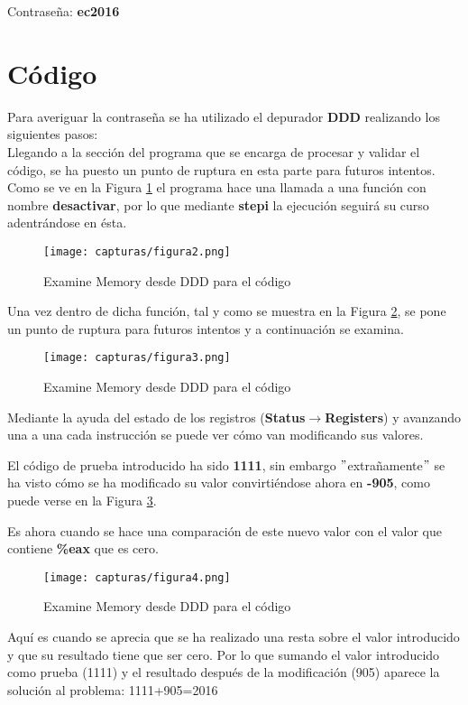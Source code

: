 Contraseña: \textbf{ec2016}
\newpage

%	

\section{Código}
Para averiguar la contraseña se ha utilizado el depurador \textbf{DDD} realizando los siguientes pasos:
\\

Llegando a la sección del programa que se encarga de procesar y validar el código, se ha puesto un punto de ruptura en esta parte para futuros intentos.\\

Como se ve en la Figura \ref{fig:figura2} el programa hace una llamada a una función con nombre \textbf{desactivar}, por lo que mediante \textbf{stepi} la ejecución seguirá su curso adentrándose en ésta.\\
\begin{figure}[H]
	\centering
	\texttt{[image: capturas/figura2.png]} 
	\caption{Examine Memory desde DDD para el código} 
	\label{fig:figura2}
\end{figure}
Una vez dentro de dicha función, tal y como se muestra en la Figura \ref{fig:figura3}, se pone un punto de ruptura para futuros intentos y a continuación se examina.


\begin{figure}[H]
	\centering
	\texttt{[image: capturas/figura3.png]} 
	\caption{Examine Memory desde DDD para el código} 
	\label{fig:figura3}
\end{figure}

Mediante la ayuda del estado de los registros (\textbf{Status}$ \rightarrow $\textbf{Registers}) y avanzando una a una cada instrucción se puede ver cómo van modificando sus valores.
\newpage



El código de prueba introducido ha sido \textbf{1111}, sin embargo $ " $extrañamente$ " $ se ha visto cómo se ha modificado su valor convirtiéndose ahora en \textbf{-905}, como puede verse en la Figura \ref{fig:figura4}.

Es ahora cuando se hace una comparación de este nuevo valor con el valor que contiene \textbf{\%eax} que es cero.
\begin{figure}[H]
	\centering
	\texttt{[image: capturas/figura4.png]} 
	\caption{Examine Memory desde DDD para el código} 
	\label{fig:figura4}
\end{figure}
Aquí es cuando se aprecia que se ha realizado una resta sobre el valor introducido y que su resultado tiene que ser cero. Por lo que sumando el valor introducido como prueba (1111) y el resultado después de la modificación (905) aparece la solución al problema: 1111+905=2016
\\

